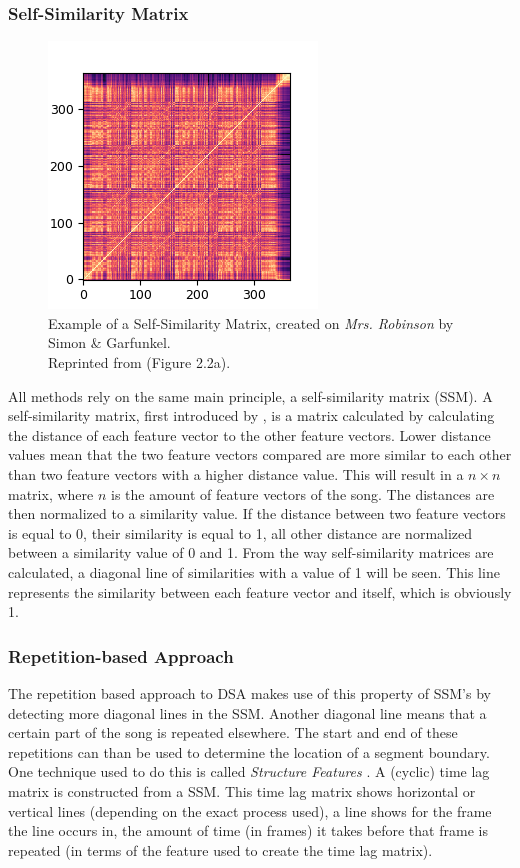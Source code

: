 \subsubsection{Self-Similarity Matrix}
\begin{figure}[t]
    \centering
    \includegraphics[width=.5\textwidth]{images/ssm}
    \caption{Example of a Self-Similarity Matrix, created on \textit{Mrs. Robinson} by Simon \& Garfunkel.\\
    Reprinted from \textcite{Jesperthesis} (Figure 2.2a).}
    \label{fig:ssm}
\end{figure}
All methods rely on the same main principle, a self-similarity matrix (SSM). A self-similarity matrix, first introduced by \textcite{Foote1999visualizing}, is a matrix calculated by calculating the distance of each feature vector to the other feature vectors. Lower distance values mean that the two feature vectors compared are more similar to each other than two feature vectors with a higher distance value. This will result in a $n\times n$ matrix, where $n$ is the amount of feature vectors of the song. The distances are then normalized to a similarity value. If the distance between two feature vectors is equal to 0, their similarity is equal to 1, all other distance are normalized between a similarity value of 0 and 1. From the way self-similarity matrices are calculated, a diagonal line of similarities with a value of 1 will be seen. This line represents the similarity between each feature vector and itself, which is obviously 1.

\subsubsection{Repetition-based Approach}
The repetition based approach to DSA makes use of this property of SSM's by detecting more diagonal lines in the SSM. Another diagonal line means that a certain part of the song is repeated elsewhere. The start and end of these repetitions can than be used to determine the location of a segment boundary. One technique used to do this is called \textit{Structure Features} \cite{Serra2012unsupervised}. A (cyclic) time lag matrix is constructed from a SSM. This time lag matrix shows horizontal or vertical lines (depending on the exact process used), a line shows for the frame the line occurs in, the amount of time (in frames) it takes before that frame is repeated (in terms of the feature used to create the time lag matrix).

